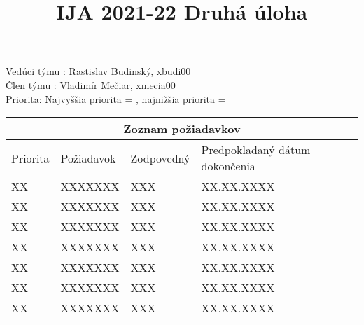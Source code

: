 \documentclass[11pt]{article}
\begin{document}
    \title{IJA 2021-22 Druhá úloha}
    \maketitle

    \noindent Vedúci týmu : Rastislav Budinský, xbudi00 \\
    Člen týmu : Vladimír Mečiar, xmecia00 \\
    Priorita: Najvyššia priorita = , najnižšia priorita = \\

    \begin{center}

        \begin{tabular}{ |p{3cm}||p{3cm}|p{3cm}|p{3cm}|  }
            \hline
            \multicolumn{4}{|c|}{Zoznam požiadavkov} \\
            \hline
            Priorita& Požiadavok & Zodpovedný & Predpokladaný dátum dokončenia\\
            \hline
            XX & XXXXXXX & XXX & XX.XX.XXXX\\
            XX & XXXXXXX & XXX & XX.XX.XXXX\\
            XX & XXXXXXX & XXX & XX.XX.XXXX\\
            XX & XXXXXXX & XXX & XX.XX.XXXX\\
            XX & XXXXXXX & XXX & XX.XX.XXXX\\
            XX & XXXXXXX & XXX & XX.XX.XXXX\\
            XX & XXXXXXX & XXX & XX.XX.XXXX\\
            \hline
        \end{tabular}

    \end{center}
\end{document}
